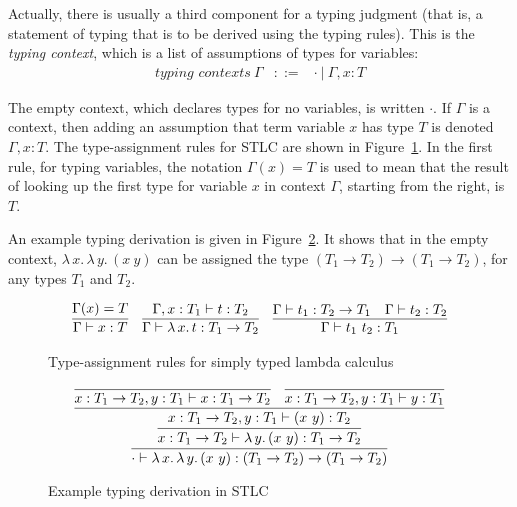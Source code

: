 \documentclass{article}
\begin{document}
Actually, there is usually a third component for a typing judgment (that is,
a statement of typing that is to be derived using the typing rules).  This
is the \emph{typing context}, which is a list of assumptions of types for
variables:
\begin{eqnarray*}
\textit{typing contexts}\ \Gamma & ::= & \cdot\ |\ \Gamma, x : T
\end{eqnarray*}

\noindent The empty context, which declares types for no variables, is
written $\cdot$.  If $\Gamma$ is a context, then adding an assumption
that term variable $x$ has type $T$ is denoted $\Gamma,x : T$.  The
type-assignment rules for STLC are shown in Figure~\ref{fig:stlc}.  In
the first rule, for typing variables, the notation $\Gamma(x) = T$ is
used to mean that the result of looking up the first type for variable
$x$ in context $\Gamma$, starting from the right, is $T$.

An example typing derivation is given in Figure~\ref{fig:stlcex}.  It
shows that in the empty context, $\lambda\,x.\,\lambda\,y.\,(x\ y)$
can be assigned the type $(T_1\to T_2)\to (T_1\to T_2)$, for any types
$T_1$ and $T_2$.

\begin{figure}
\[
\begin{array}{lll}
\infer{\Gamma\vdash x : T}{\Gamma(x) = T}

&

\infer{\Gamma\vdash \lambda\,x.\,t : T_1 \to T_2}
      {\Gamma,x:T_1\vdash t:T_2}

&

\infer{\Gamma\vdash t_1\ t_2 : T_1}
      {\Gamma\vdash t_1 : T_2 \to T_1 &
       \Gamma\vdash t_2 : T_2}

\end{array}
\]
\caption{Type-assignment rules for simply typed lambda calculus}
\label{fig:stlc}
\end{figure}


\begin{figure}
\[
\infer{\cdot \vdash \lambda\,x.\, \lambda\,y.\,(x\ y) : (T_1\to T_2)\to
(T_1\to T_2)}
      {\infer{x:T_1 \to T_2 \vdash \lambda\,y.\,(x\ y) : T_1\to T_2}
             {\infer{x:T_1 \to T_2, y:T_1 \vdash (x\ y) : T_2}
                    {\infer{x:T_1 \to T_2, y:T_1 \vdash x : T_1 \to T_2}{\ } &
                     \infer{x:T_1 \to T_2, y:T_1 \vdash y : T_1}{\ }}}}
\]
\caption{Example typing derivation in STLC}
\label{fig:stlcex}
\end{figure}
\end{document}
